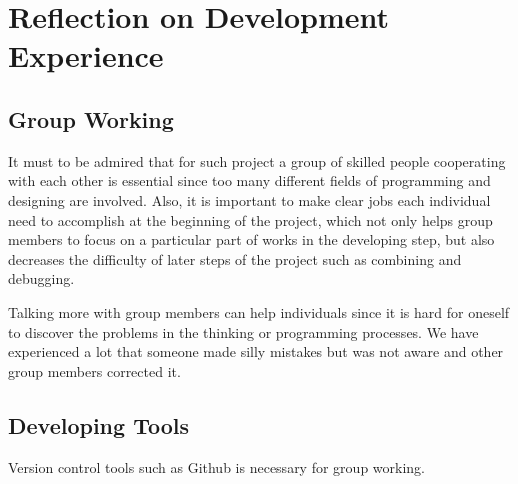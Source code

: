 \section{Reflection on Development Experience}

\subsection{Group Working}
It must to be admired that for such project a group of skilled people cooperating with each other is essential since too many different fields of programming and designing are involved. Also, it is important to make clear jobs each individual need to accomplish at the beginning of the project, which not only helps group members to focus on a particular part of works in the developing step, but also decreases the difficulty of later steps of the project such as combining and debugging.

Talking more with group members can help individuals since it is hard for oneself to discover the problems in the thinking or programming processes. We have experienced a lot that someone made silly mistakes but was not aware and other group members corrected it.

\subsection{Developing Tools}
Version control tools such as Github is necessary for group working. 